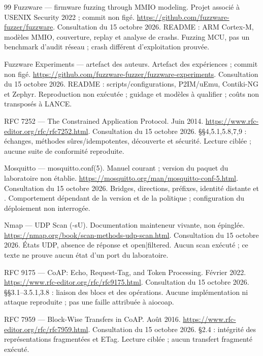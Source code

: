 \documentclass[11pt,a4paper]{article}
\newcommand{\code}[1]{{\small\ttfamily\path{#1}}}
\begin{document}
\begin{thebibliography}{99}
 Fuzzware --- firmware fuzzing through MMIO modeling. Projet associé à USENIX Security 2022 ; commit non figé. \url{https://github.com/fuzzware-fuzzer/fuzzware}. Consultation du 15 octobre 2026. README : ARM Cortex-M, modèles MMIO, couverture, replay et analyse de crashs. Fuzzing MCU, pas un benchmark d'audit réseau ; crash différent d'exploitation prouvée.

 Fuzzware Experiments --- artefact des auteurs. Artefact des expériences ; commit non figé. \url{https://github.com/fuzzware-fuzzer/fuzzware-experiments}. Consultation du 15 octobre 2026. README : scripts/configurations, P2IM/uEmu, Contiki-NG et Zephyr. Reproduction non exécutée ; guidage et modèles à qualifier ; coûts non transposés à LANCE.

 RFC 7252 --- The Constrained Application Protocol. Juin 2014. \url{https://www.rfc-editor.org/rfc/rfc7252.html}. Consultation du 15 octobre 2026. §§4,5.1,5.8,7,9 : échanges, méthodes sûres/idempotentes, découverte et sécurité. Lecture ciblée ; aucune suite de conformité reproduite.

 Mosquitto --- mosquitto.conf(5). Manuel courant ; version du paquet du laboratoire non établie. \url{https://mosquitto.org/man/mosquitto-conf-5.html}. Consultation du 15 octobre 2026. Bridges, directions, préfixes, identité distante et \code{check_retain_source}. Comportement dépendant de la version et de la politique ; configuration du déploiement non interrogée.

 Nmap --- UDP Scan (-sU). Documentation mainteneur vivante, non épinglée. \url{https://nmap.org/book/scan-methods-udp-scan.html}. Consultation du 15 octobre 2026. États UDP, absence de réponse et open|filtered. Aucun scan exécuté ; ce texte ne prouve aucun état d'un port du laboratoire.

 RFC 9175 --- CoAP: Echo, Request-Tag, and Token Processing. Février 2022. \url{https://www.rfc-editor.org/rfc/rfc9175.html}. Consultation du 15 octobre 2026. §§3.1--3.5.1,3.8 : liaison des blocs et des opérations. Aucune implémentation ni attaque reproduite ; pas une faille attribuée à aiocoap.

 RFC 7959 --- Block-Wise Transfers in CoAP. Août 2016. \url{https://www.rfc-editor.org/rfc/rfc7959.html}. Consultation du 15 octobre 2026. §2.4 : intégrité des représentations fragmentées et ETag. Lecture ciblée ; aucun transfert fragmenté exécuté.


\end{thebibliography}
\end{document}
